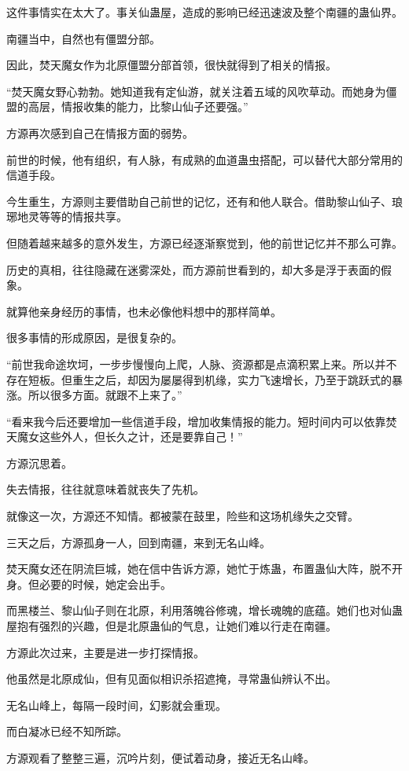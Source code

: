 \begin{this_body}
这件事情实在太大了。事关仙蛊屋，造成的影响已经迅速波及整个南疆的蛊仙界。

南疆当中，自然也有僵盟分部。

因此，焚天魔女作为北原僵盟分部首领，很快就得到了相关的情报。

“焚天魔女野心勃勃。她知道我有定仙游，就关注着五域的风吹草动。而她身为僵盟的高层，情报收集的能力，比黎山仙子还要强。”

方源再次感到自己在情报方面的弱势。

前世的时候，他有组织，有人脉，有成熟的血道蛊虫搭配，可以替代大部分常用的信道手段。

今生重生，方源则主要借助自己前世的记忆，还有和他人联合。借助黎山仙子、琅琊地灵等等的情报共享。

但随着越来越多的意外发生，方源已经逐渐察觉到，他的前世记忆并不那么可靠。

历史的真相，往往隐藏在迷雾深处，而方源前世看到的，却大多是浮于表面的假象。

就算他亲身经历的事情，也未必像他料想中的那样简单。

很多事情的形成原因，是很复杂的。

“前世我命途坎坷，一步步慢慢向上爬，人脉、资源都是点滴积累上来。所以并不存在短板。但重生之后，却因为屡屡得到机缘，实力飞速增长，乃至于跳跃式的暴涨。所以很多方面。就跟不上来了。”

“看来我今后还要增加一些信道手段，增加收集情报的能力。短时间内可以依靠焚天魔女这些外人，但长久之计，还是要靠自己！”

方源沉思着。

失去情报，往往就意味着就丧失了先机。

就像这一次，方源还不知情。都被蒙在鼓里，险些和这场机缘失之交臂。

三天之后，方源孤身一人，回到南疆，来到无名山峰。

焚天魔女还在阴流巨城，她在信中告诉方源，她忙于炼蛊，布置蛊仙大阵，脱不开身。但必要的时候，她定会出手。

而黑楼兰、黎山仙子则在北原，利用落魄谷修魂，增长魂魄的底蕴。她们也对仙蛊屋抱有强烈的兴趣，但是北原蛊仙的气息，让她们难以行走在南疆。

方源此次过来，主要是进一步打探情报。

他虽然是北原成仙，但有见面似相识杀招遮掩，寻常蛊仙辨认不出。

无名山峰上，每隔一段时间，幻影就会重现。

而白凝冰已经不知所踪。

方源观看了整整三遍，沉吟片刻，便试着动身，接近无名山峰。


\end{this_body}
